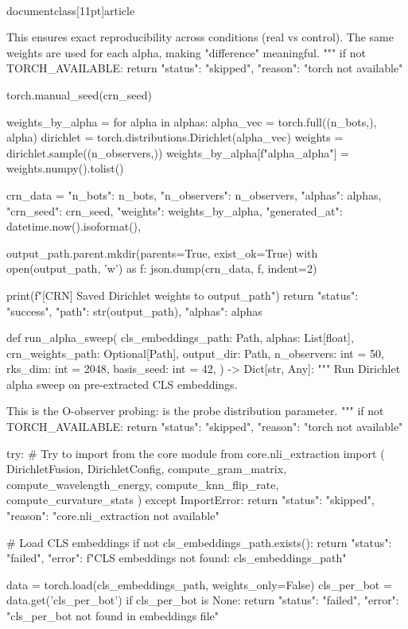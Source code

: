 \\documentclass[11pt]{article}
\begin{document}
\begin{CodeBlock}
    This ensures exact reproducibility across conditions (real vs control).
    The same weights are used for each alpha, making "difference" meaningful.
    """
    if not TORCH_AVAILABLE:
        return {"status": "skipped", "reason": "torch not available"}
    
    torch.manual_seed(crn_seed)
    
    weights_by_alpha = {}
    for alpha in alphas:
        alpha_vec = torch.full((n_bots,), alpha)
        dirichlet = torch.distributions.Dirichlet(alpha_vec)
        weights = dirichlet.sample((n_observers,))
        weights_by_alpha[f"alpha_{alpha}"] = weights.numpy().tolist()
    
    crn_data = {
        "n_bots": n_bots,
        "n_observers": n_observers,
        "alphas": alphas,
        "crn_seed": crn_seed,
        "weights": weights_by_alpha,
        "generated_at": datetime.now().isoformat(),
    }
    
    output_path.parent.mkdir(parents=True, exist_ok=True)
    with open(output_path, 'w') as f:
        json.dump(crn_data, f, indent=2)
    
    print(f"[CRN] Saved Dirichlet weights to {output_path}")
    return {"status": "success", "path": str(output_path), "alphas": alphas}


def run_alpha_sweep(
    cls_embeddings_path: Path,
    alphas: List[float],
    crn_weights_path: Optional[Path],
    output_dir: Path,
    n_observers: int = 50,
    rks_dim: int = 2048,
    basis_seed: int = 42,
) -> Dict[str, Any]:
    """
    Run Dirichlet alpha sweep on pre-extracted CLS embeddings.
    
    This is the O-observer probing:  is the probe distribution parameter.
    """
    if not TORCH_AVAILABLE:
        return {"status": "skipped", "reason": "torch not available"}
    
    try:
        # Try to import from the core module
        from core.nli_extraction import (
            DirichletFusion, DirichletConfig,
            compute_gram_matrix, compute_wavelength_energy,
            compute_knn_flip_rate, compute_curvature_stats
        )
    except ImportError:
        return {"status": "skipped", "reason": "core.nli_extraction not available"}
    
    # Load CLS embeddings
    if not cls_embeddings_path.exists():
        return {"status": "failed", "error": f"CLS embeddings not found: {cls_embeddings_path}"}
    
    data = torch.load(cls_embeddings_path, weights_only=False)
    cls_per_bot = data.get('cls_per_bot')
    if cls_per_bot is None:
        return {"status": "failed", "error": "cls_per_bot not found in embeddings file"}
    

\end{CodeBlock}
\end{document}
